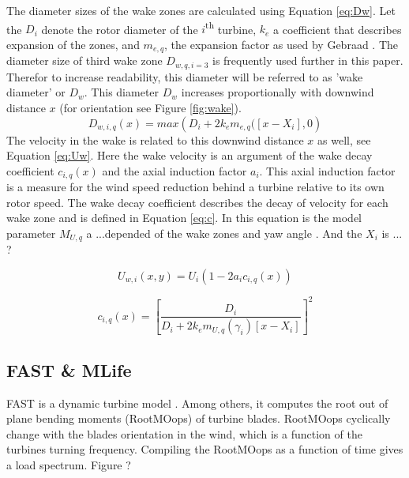 The diameter sizes of the wake zones are calculated using Equation \ref{eq:Dw}. Let the $D_i$ denote the rotor diameter of the $i${\textsuperscript{th}} turbine, $k_e$ a coefficient that describes expansion of the zones, and $m_{e,q}$, the expansion factor as used by Gebraad \cite{Gebraad2016}. The diameter size of third wake zone $D_{w,q,i=3}$ is frequently used further in this paper. Therefor to increase readability, this diameter will be referred to as 'wake diameter' or $D_w$. This diameter $D_w$ increases proportionally with downwind distance $x$ (for orientation see Figure \ref{fig:wake}).
\begin{equation}
\label{eq:Dw}
D_{w,i,q}(x) = max({D_i + 2k_em_{e,q}([x - X_i],0} )
\end{equation}
The velocity in the wake is related to this downwind distance $x$ as well, see Equation \ref{eq:Uw}. Here the wake velocity is an argument of the wake decay coefficient $c_{i,q}(x)$ and the axial induction factor $a_i$. This axial induction factor is a measure for the wind speed reduction behind a turbine relative to its own rotor speed. The wake decay coefficient describes the decay of velocity for each wake zone and is defined in Equation \ref{eq:c}. In this equation is the model parameter $M_{U,q}$ a ...depended of the wake zones and yaw angle \cite{Gebraad2016}. And the $X_i$ is ... ?

\begin{equation}
\label{eq:Uw}
U_{w,i}(x,y) = U_i\left( {1-2a_{i}c_{i,q}(x)} \right)
\end{equation} 

\begin{equation}
\label{eq:c}
c_{i,q}(x) = \left[ \frac{D_i}{D_i + 2k_em_{U,q}(\gamma_i)[x - X_i]} \right]^2
\end{equation}



\subsection{FAST \& MLife} \label{sec:fast} FAST is a dynamic turbine model \cite{Jonkman2005}. Among others, it computes the root out of plane bending moments (RootMOops) of turbine blades. RootMOops cyclically change with the blades orientation in the wind, which is a function of the turbines turning frequency. Compiling the RootMOops as a function of time gives a load spectrum. Figure ?

